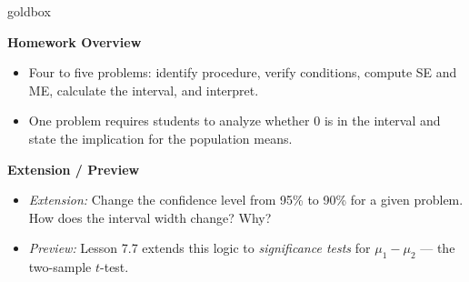 \documentclass[10pt]{article}
\begin{document}
\begin{skillbox}{goldbox}
\begin{minipage}[t]{0.48\linewidth}
    \textbf{Homework Overview}
    \begin{itemize}
        \item Four to five problems: identify procedure, verify conditions, compute SE
              and ME, calculate the interval, and interpret.
        \item One problem requires students to analyze whether 0 is in the interval
              and state the implication for the population means.
    \end{itemize}
\end{minipage}
\hfill
\begin{minipage}[t]{0.48\linewidth}
    \textbf{Extension / Preview}
    \begin{itemize}
        \item \textit{Extension:} Change the confidence level from 95\% to 90\% for
              a given problem. How does the interval width change? Why?
        \item \textit{Preview:} Lesson 7.7 extends this logic to \emph{significance
              tests} for $\mu_1 - \mu_2$ --- the two-sample $t$-test.
    \end{itemize}
\end{minipage}
\end{skillbox}
\end{document}
